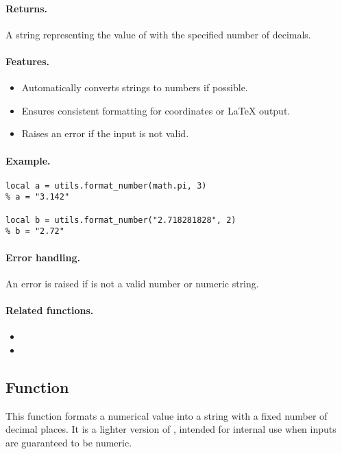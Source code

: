 \paragraph{Returns.}
A string representing the value of  with the specified number of decimals.

\paragraph{Features.}
\begin{itemize}
\item Automatically converts strings to numbers if possible.
\item Ensures consistent formatting for \TIKZ{} coordinates or LaTeX output.
\item Raises an error if the input is not valid.
\end{itemize}

\paragraph{Example.}
\begin{verbatim}
local a = utils.format_number(math.pi, 3)
% a = "3.142"

local b = utils.format_number("2.718281828", 2)
% b = "2.72"
\end{verbatim}

\paragraph{Error handling.}
An error is raised if  is not a valid number or numeric string.

\paragraph{Related functions.}
\begin{itemize}
\item {}
\item {}
\end{itemize}

\subsection{Function }
\label{sub:function_utils_format_coord}

This function formats a numerical value into a string with a fixed number of decimal places. It is a lighter version of , intended for internal use when inputs are guaranteed to be numeric.

